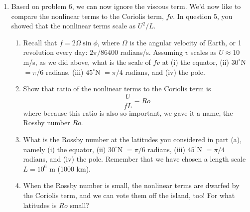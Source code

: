 \documentclass[letterpaper, 11pt]{article}
\newcommand{\1}{\mathds{1}}	%
\theoremstyle{definition}
\begin{document}
\begin{enumerate}[resume]
(6)

\textbf{(a)} 
\[
\nu\frac{\partial^2 u}{\partial x^2} \sim \nu \cdot \frac{U}{L^2} = \boxed{\frac{\nu U}{L^2}}
\]

\textbf{(b)} Ratio of nonlinear to viscous terms:
\[
\frac{U^2/L}{\nu U/L^2} = \frac{U^2}{L} \cdot \frac{L^2}{\nu U} = \boxed{\frac{UL}{\nu} \equiv Re}
\]

\textbf{(c)} With $U = 10$ m/s, $L = 10^6$ m, $\nu = 10^{-5}$ m$^2$/s:
\[
Re = \frac{10 \times 10^6}{10^{-5}} = \boxed{10^{12}}
\]

The Reynolds number is enormous, so viscosity is completely negligible compared to the nonlinear terms.

\textbf{(d)} For $Re \approx 1$:
\[
L = \frac{\nu}{U} = \frac{10^{-5}}{10} = \boxed{10^{-6} \text{ m} = 1 \text{ micrometer}}
\]

\textbf{(e)} Number of grid points needed:
\[
N = \frac{10^7}{10^{-6}} \times \frac{10^7}{10^{-6}} \times \frac{10^4}{10^{-6}} = 10^{13} \times 10^{13} \times 10^{10} = \boxed{10^{36} \text{ grid points}}
\]

This is astronomically large and completely impossible to compute.

\item Based on problem 6, we can now ignore the viscous term. We'd now like to compare the nonlinear terms to the Coriolis term, $fv$. In question 5, you showed that the nonlinear terms scale as $U^2/L$.

\begin{enumerate}[label=(\alph*)]
\item Recall that $f = 2\Omega \sin \phi$, where $\Omega$ is the angular velocity of Earth, or 1 revolution every day: $2\pi/86400$ radians/s. Assuming $v$ scales as $U \approx 10$ m/s, as we did above, what is the scale of $fv$ at (i) the equator, (ii) $30^\circ$N $= \pi/6$ radians, (iii) $45^\circ$N $= \pi/4$ radians, and (iv) the pole.
\item Show that ratio of the nonlinear terms to the Coriolis term is
\[
\frac{U}{fL} \equiv Ro
\]
where because this ratio is also so important, we gave it a name, the Rossby number $Ro$.
\item What is the Rossby number at the latitudes you considered in part (a), namely (i) the equator, (ii) $30^\circ$N $= \pi/6$ radians, (iii) $45^\circ$N $= \pi/4$ radians, and (iv) the pole. Remember that we have chosen a length scale $L = 10^6$ m (1000 km).
\item When the Rossby number is small, the nonlinear terms are dwarfed by the Coriolis term, and we can vote them off the island, too! For what latitudes is $Ro$ small?
\end{enumerate}


\end{enumerate}
\end{document}
